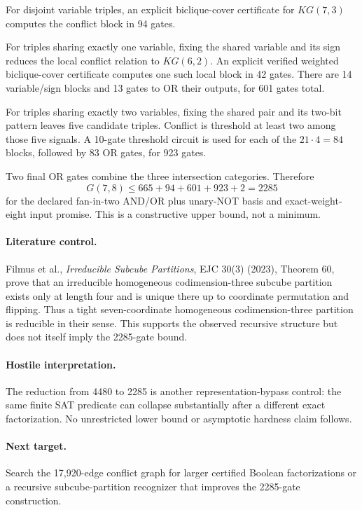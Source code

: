 For disjoint variable triples, an explicit biclique-cover certificate for $KG(7,3)$
computes the conflict block in 94 gates.

For triples sharing exactly one variable, fixing the shared variable and its sign
reduces the local conflict relation to $KG(6,2)$. An explicit verified weighted
biclique-cover certificate computes one such local block in 42 gates. There are
14 variable/sign blocks and 13 gates to OR their outputs, for 601 gates total.

For triples sharing exactly two variables, fixing the shared pair and its two-bit
pattern leaves five candidate triples. Conflict is threshold at least two among
those five signals. A 10-gate threshold circuit is used for each of the
$21\cdot4=84$ blocks, followed by 83 OR gates, for 923 gates.

Two final OR gates combine the three intersection categories. Therefore
\[
\boxed{G(7,8)\le 665+94+601+923+2=2285}
\]
for the declared fan-in-two AND/OR plus unary-NOT basis and exact-weight-eight
input promise. This is a constructive upper bound, not a minimum.

\paragraph{Literature control.}
Filmus et al., \emph{Irreducible Subcube Partitions}, EJC 30(3) (2023), Theorem 60,
prove that an irreducible homogeneous codimension-three subcube partition exists only
at length four and is unique there up to coordinate permutation and flipping. Thus a
tight seven-coordinate homogeneous codimension-three partition is reducible in their
sense. This supports the observed recursive structure but does not itself imply the
2285-gate bound.

\paragraph{Hostile interpretation.}
The reduction from 4480 to 2285 is another representation-bypass control:
the same finite SAT predicate can collapse substantially after a different exact
factorization. No unrestricted lower bound or asymptotic hardness claim follows.

\paragraph{Next target.}
Search the 17,920-edge conflict graph for larger certified Boolean factorizations or
a recursive subcube-partition recognizer that improves the 2285-gate construction.

